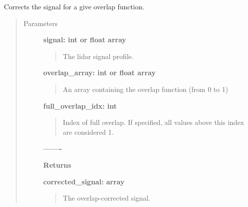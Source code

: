 \documentclass[letterpaper,10pt,english]{sphinxmanual}
\begin{document}
\begin{fulllineitems}
\label{pre_processing:pre_processing.correct_overlap}
Corrects the signal for a give overlap function.
\begin{quote}\begin{description}
\item[{Parameters}] \leavevmode
\textbf{signal: int or float array}
\begin{quote}

The lidar signal profile.
\end{quote}

\textbf{overlap\_array: int or float array}
\begin{quote}

An array containing the overlap function (from 0 to 1)
\end{quote}

\textbf{full\_overlap\_idx: int}
\begin{quote}

Index of full overlap. If specified, all values above this index are considered 1.
\end{quote}

\textbf{-------}

\textbf{Returns}

\textbf{corrected\_signal: array}
\begin{quote}

The overlap-corrected signal.
\end{quote}

\end{description}\end{quote}

\end{fulllineitems}

\end{document}
